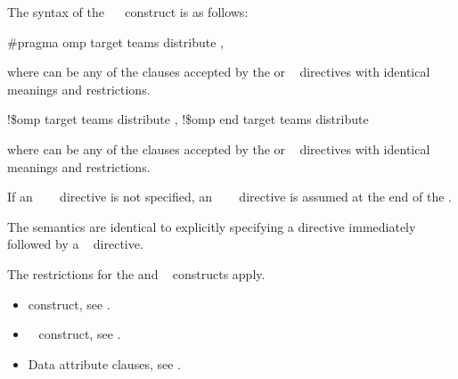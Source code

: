 \syntax
The syntax of the ~~ construct is as follows:

\ccppspecificstart
\begin{boxedcode}
\#pragma omp target teams distribute \plc{[clause[ [},\plc{] clause] ... ]}
\end{boxedcode}

where  can be any of the clauses accepted by the  or ~ directives 
with identical meanings and restrictions.
\ccppspecificend

\fortranspecificstart
\begin{boxedcode}
!\$omp target teams distribute \plc{[clause[ [},\plc{] clause] ... ]}
\plc{[}!\$omp end target teams distribute\plc{]}
\end{boxedcode}

where  can be any of the clauses accepted by the  or ~ directives 
with identical meanings and restrictions.

If an ~~~ directive is not specified, an 
~~~ directive is assumed at the end of the .
\fortranspecificend

\descr
The semantics are identical to explicitly specifying a  directive immediately 
followed by a ~ directive.

\restrictions
The restrictions for the  and ~ constructs apply.

\crossreferences
\begin{itemize}
\item {} construct, see 
.

\item {}~ construct, see 
.

\item Data attribute clauses, see 
.
\end{itemize}










